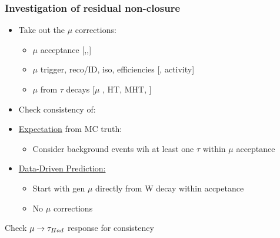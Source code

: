 \documentclass{beamer}
\begin{document}
\begin{frame}
 \frametitle{Investigation of residual non-closure}
 \begin{itemize}
  \item Take out the $\mu$ corrections:
  \begin{itemize}
   \item $\mu$ acceptance [\HT,\MHT,\NJets]
   \item $\mu$ trigger, reco/ID, iso, efficiencies [\pt, activity]
   \item $\mu$ from $\tau$ decays [$\mu$ \pt, HT, MHT, \NJets]
  \end{itemize}
  \item Check consistency of:
  \item \uline{Expectation} from MC truth:
  \begin{itemize}
   \item Consider \hadtau background events wih at least one $\tau$ within $\mu$ acceptance
  \end{itemize}
  \item \uline{Data-Driven Prediction:}
  \begin{itemize}
   \item Start with gen $\mu$ directly from W decay within accpetance
   \item No $\mu$ corrections
  \end{itemize}
 \end{itemize}
 \begin{block}{}
 \centering
 \Large Check $\mu\rightarrow\tau_{Had}$ response for consistency
 \end{block}
\end{frame}
\end{document}
